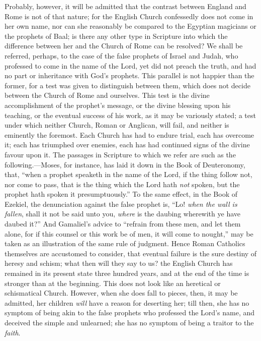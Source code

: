 Probably, however, it will be admitted that the contrast between
England and Rome is not of that nature; for the English Church
confessedly does not come in her own name, nor can she reasonably be
compared to the Egyptian magicians or the prophets of Baal; is there
any other type in Scripture into which the difference between her and
the Church of Rome can be resolved? We shall be referred, perhaps, to
the case of the false prophets of Israel and Judah, who professed to
come in the name of the Lord, yet did not preach the truth, and had no
part or inheritance with God's prophets. This parallel is not happier
than the former, for a test was given to distinguish between them,
which does not decide between the Church of Rome and ourselves. This
test is the divine accomplishment of the prophet's message, or the
divine blessing upon his teaching, or the eventual success of his
work, as it may be variously stated; a test under which neither
Church, Roman or Anglican, will fail, and neither is eminently the
foremost. Each Church has had to endure trial, each has overcome it;
each has triumphed over enemies, each has had continued signs of the
divine favour upon it. The passages in Scripture to which we refer are
such as the following.—Moses, for instance, has laid it down in the
Book of Deuteronomy, that, ``when a prophet speaketh in the name of the Lord, if the thing follow not, nor come to pass, that is
the thing which the Lord hath \emph{not} spoken, but the prophet hath
spoken it presumptuously.'' To the same effect, in the Book of
Ezekiel, the denunciation against the false prophet is, ``Lo! \emph{when
the wall is fallen}, shall it not be said unto you, \emph{where} is
the daubing wherewith ye have daubed it?'' And Gamaliel's advice
to ``refrain from these men, and let them alone, for if this
counsel or this work be of men, it will come to nought,'' may be
taken as an illustration of the same rule of judgment. Hence Roman
Catholics themselves are accustomed to consider, that eventual failure
is the sure destiny of heresy and schism; what then will they say to
us? the English Church has remained in its present state three hundred
years, and at the end of the time is stronger than at the beginning.
This does not look like an heretical or schismatical Church. However,
when she does fall to pieces, then, it may be admitted, her children \emph{will}
have a reason for deserting her; till then, she has no symptom of
being akin to the false prophets who professed the Lord's name, and
deceived the simple and unlearned; she has no symptom of being a
traitor to the \emph{faith}.

